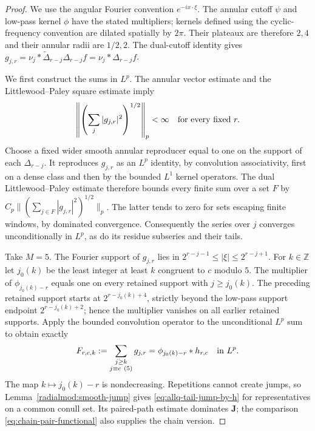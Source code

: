 \documentclass[11pt]{article}
\numberwithin{equation}{section}
\theoremstyle{remark}
\theoremstyle{definition}
\begin{document}
\begin{proof}
We use the angular Fourier convention $e^{-ix\cdot\xi}$.
The annular cutoff $\psi$ and low-pass kernel $\phi$ have the stated
multipliers; kernels defined using the cyclic-frequency convention
are dilated spatially by $2\pi$. Their plateaux are therefore $2,4$
and their annular radii are $1/2,2$. The dual-cutoff identity gives
$g_{j,r}=\nu_j*\widetilde\Delta_{r-j}\Delta_{r-j}f=\nu_j*\Delta_{r-j}f$.

We first construct the sums in $L^p$. The annular vector estimate
and the Littlewood--Paley square estimate imply
\[
 \left\|\left(\sum_j|g_{j,r}|^2\right)^{1/2}\right\|_p<\infty
 \quad\hbox{for every fixed }r.
\]
Choose a fixed wider smooth annular reproducer equal to one on the
support of each $\Delta_{r-j}$.  It reproduces $g_{j,r}$ as an $L^p$
identity, by convolution associativity, first on a dense class and then
by the bounded $L^1$ kernel operators.  The dual Littlewood--Paley
estimate therefore bounds every finite sum over a set $F$ by
$C_p\|(\sum_{j\in F}|g_{j,r}|^2)^{1/2}\|_p$.
The latter tends to zero for sets escaping finite windows, by dominated
convergence.  Consequently the series over $j$ converges
unconditionally in $L^p$, as do its residue subseries and their tails.

Take $M=5$.  The Fourier support of $g_{j,r}$ lies in
$2^{r-j-1}\le|\xi|\le2^{r-j+1}$.  For $k\in\mathbb Z$ let
$j_0(k)$ be the least integer at least $k$ congruent to $c$ modulo $5$.
The multiplier of $\phi_{j_0(k)-r}$ equals one on every retained
support with $j\ge j_0(k)$.  The preceding retained support starts at
$2^{r-j_0(k)+4}$, strictly beyond the low-pass support endpoint
$2^{r-j_0(k)+2}$; hence the multiplier vanishes on all earlier retained
supports.  Apply the bounded convolution operator to the unconditional
$L^p$ sum to obtain exactly
\[
 F_{r,c,k}:=\sum_{\substack{j\ge k\\j\equiv c\ (5)}}g_{j,r}
       =\phi_{j_0(k)-r}*h_{r,c}\quad\hbox{in }L^p.
\]
The map $k\mapsto j_0(k)-r$ is nondecreasing.  Repetitions cannot create
jumps, so Lemma~\ref{radialmod:smooth-jump} gives
\eqref{eq:allq-tail-jump-by-h} for representatives on a common conull
set.  Its paired-path estimate dominates $\mathbf J$; the comparison
\eqref{eq:chain-pair-functional} also supplies the chain version.


\end{proof}
\end{document}
